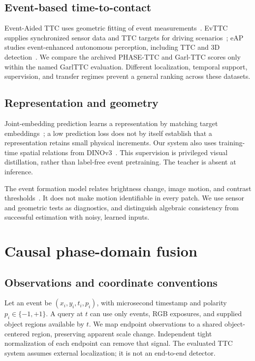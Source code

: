 \documentclass[twocolumn,letterpaper]{article}
\begin{document}
\subsection{Event-based time-to-contact}
Event-Aided TTC uses geometric fitting of event measurements~\citep{eventaided}. EvTTC supplies synchronized sensor data and TTC targets for driving scenarios~\citep{evttc}; eAP studies event-enhanced autonomous perception, including TTC and 3D detection~\citep{eap}. We compare the archived PHASE-TTC and Garl-TTC scores only within the named GarlTTC evaluation. Different localization, temporal support, supervision, and transfer regimes prevent a general ranking across these datasets.

\subsection{Representation and geometry}
Joint-embedding prediction learns a representation by matching target embeddings~\citep{ijepa}; a low prediction loss does not by itself establish that a representation retains small physical increments. Our system also uses training-time spatial relations from DINOv3~\citep{dinov3}. This supervision is privileged visual distillation, rather than label-free event pretraining. The teacher is absent at inference.

The event formation model relates brightness change, image motion, and contrast thresholds~\citep{eventsurvey}. It does not make motion identifiable in every patch. We use sensor and geometric tests as diagnostics, and distinguish algebraic consistency from successful estimation with noisy, learned inputs.

\section{Causal phase-domain fusion}
\label{sec:method}
\subsection{Observations and coordinate conventions}
Let an event be $(x_i,y_i,t_i,p_i)$, with microsecond timestamp and polarity $p_i\in\{-1,+1\}$. A query at $t$ can use only events, RGB exposures, and supplied object regions available by $t$. We map endpoint observations to a shared object-centered region, preserving apparent scale change. Independent tight normalization of each endpoint can remove that signal. The evaluated TTC system assumes external localization; it is not an end-to-end detector.
\end{document}
